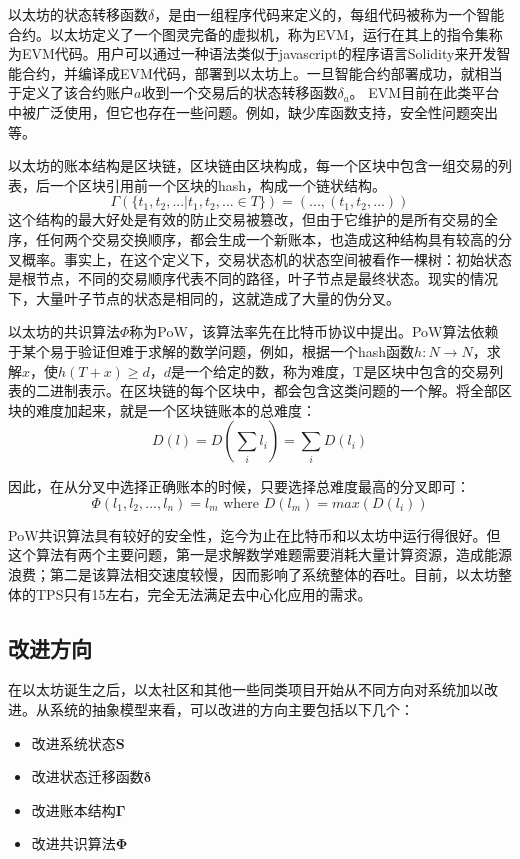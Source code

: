 \documentclass[UTF8,nofonts]{ctexart}
\begin{document}
\begin{multicols}{2}
以太坊的状态转移函数$\delta$，是由一组程序代码来定义的，每组代码被称为一个智能合约。以太坊定义了一个图灵完备的虚拟机，称为EVM，运行在其上的指令集称为EVM代码。用户可以通过一种语法类似于javascript的程序语言Solidity来开发智能合约，并编译成EVM代码，部署到以太坊上\cite{dannen2017introducing}。一旦智能合约部署成功，就相当于定义了该合约账户$a$收到一个交易后的状态转移函数$\delta_{a}$。
EVM目前在此类平台中被广泛使用，但它也存在一些问题。例如，缺少库函数支持，安全性问题突出等。

以太坊的账本结构是区块链\cite{nakamoto2008bitcoin}，区块链由区块构成，每一个区块中包含一组交易的列表，后一个区块引用前一个区块的hash，构成一个链状结构。
\begin{equation}
\Gamma(\lbrace t_{1}, t_{2},...\vert t_{1}, t_{2},... \in T \rbrace) = (..., (t_{1}, t_{2},...)) 
\end{equation}
这个结构的最大好处是有效的防止交易被篡改，但由于它维护的是所有交易的全序，任何两个交易交换顺序，都会生成一个新账本，也造成这种结构具有较高的分叉概率。事实上，在这个定义下，交易状态机的状态空间被看作一棵树：初始状态是根节点，不同的交易顺序代表不同的路径，叶子节点是最终状态。现实的情况下，大量叶子节点的状态是相同的，这就造成了大量的伪分叉。

以太坊的共识算法$\Phi$称为PoW，该算法率先在比特币协议中提出\cite{nakamoto2008bitcoin}。PoW算法依赖于某个易于验证但难于求解的数学问题，例如，根据一个hash函数$h:N \rightarrow N$，求解$x$，使$h(T+x) \geq d$，$d$是一个给定的数，称为难度，T是区块中包含的交易列表的二进制表示。在区块链的每个区块中，都会包含这类问题的一个解。将全部区块的难度加起来，就是一个区块链账本的总难度：
\begin{equation}
D(l) = D(\sum_{i} l_{i}) = \sum_{i} D(l_{i})
\end{equation}

因此，在从分叉中选择正确账本的时候，只要选择总难度最高的分叉即可：
\begin{equation}
 \Phi (l_{1}, l_{2}, ..., l_{n}) = l_{m} \text{ where } D(l_{m}) = max(D(l_{i}))
\end{equation}

PoW共识算法具有较好的安全性，迄今为止在比特币和以太坊中运行得很好。但这个算法有两个主要问题，第一是求解数学难题需要消耗大量计算资源，造成能源浪费；第二是该算法相交速度较慢，因而影响了系统整体的吞吐。目前，以太坊整体的TPS只有15左右，完全无法满足去中心化应用的需求。

\subsection{改进方向}
在以太坊诞生之后，以太社区和其他一些同类项目开始从不同方向对系统加以改进。从系统的抽象模型来看，可以改进的方向主要包括以下几个：
\begin{itemize}
	\item 改进系统状态$\boldsymbol{S}$	
	\item 改进状态迁移函数$\boldsymbol{\delta}$	
	\item 改进账本结构$\boldsymbol{\Gamma}$
	\item 改进共识算法$\boldsymbol{\Phi}$
\end{itemize}


\end{multicols}
\end{document}
